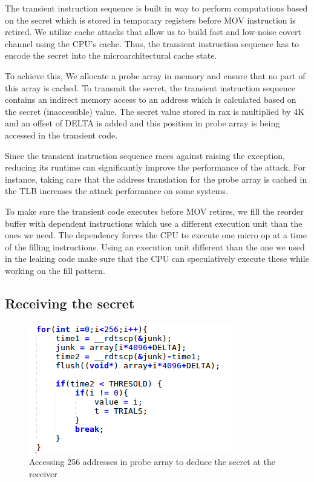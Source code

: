 \documentclass[runningheads]{llncs}
\begin{document}
The transient instruction sequence is built in way to perform computations based on the secret which is stored in temporary registers before MOV instruction is retired. We utilize cache attacks that allow us to build fast and low-noise covert channel using the CPU’s cache. Thus, the transient instruction sequence has to encode the secret into the microarchitectural cache state. 

To achieve this, We allocate a probe array in memory and ensure that no part of this array is cached. To transmit the secret, the transient instruction sequence contains an indirect memory access to an address which is calculated based on the secret (inaccessible) value. The secret value stored in rax is multiplied by 4K and an offset of DELTA is added and this position in probe array is being accessed in the transient code. 

Since the transient instruction sequence races against raising the exception, reducing its runtime can significantly improve the performance of the attack. For instance, taking care that the address translation for the probe array is cached in the TLB increases the attack performance on some systems. 

To make sure the transient code executes before MOV retires, we fill the reorder buffer with dependent instructions which use a different execution unit than the ones we need. The dependency forces the CPU to execute one micro op at a time of the filling instructions. Using an execution unit different than the one we used in the leaking code make sure that the CPU can speculatively execute these while working on the fill pattern.

\subsection{Receiving the secret}

\begin{figure}[H]
\centerline{\includegraphics[scale=0.6]{images/getvalue.png}}
\caption{Accessing 256 addresses in probe array to deduce the secret at the receiver} \label{getvalue}
\end{figure}
\end{document}
